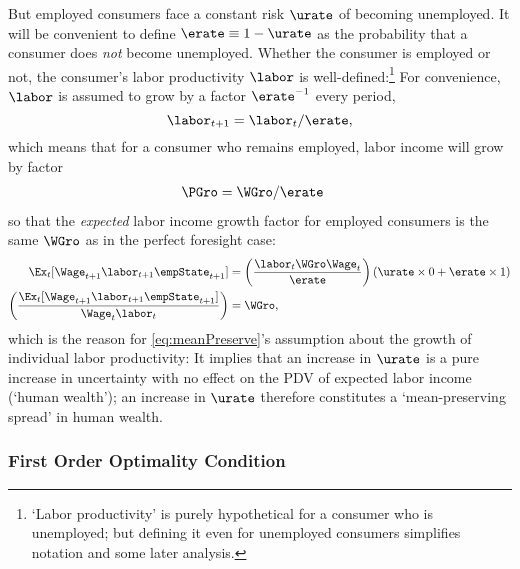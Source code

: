 \documentclass{\handout}
\begin{document}
But employed consumers face a constant risk $\urate$ of becoming unemployed.  
It will be convenient to define $\erate\equiv 1-\urate$ as the probability that a consumer does {\it not} become unemployed.  Whether the consumer is employed or not, the consumer's labor productivity $\labor$ is well-defined:\footnote{`Labor productivity' is purely hypothetical for a consumer who is unemployed; but defining it even for unemployed consumers simplifies notation and some later analysis.}  For convenience, $\labor$ is assumed to grow by a factor $\erate^{-1}$ every period,
\begin{equation}
\labor_{t+1} =    \labor_{t}/\erate \label{eq:meanPreserve},
\end{equation}
which means that for a consumer who remains employed, labor income will grow by factor
\begin{equation}\begin{gathered}\begin{aligned}
  \PGro & =  \WGro/\erate
\end{aligned}\end{gathered}\end{equation}
so that the {\it expected} labor income growth factor for
employed consumers is the same $\WGro$ as in the perfect foresight case:
\begin{equation*}\begin{gathered}\begin{aligned}
  \Ex_{t}[\Wage_{t+1}\labor_{t+1}\empState_{t+1}] & =   \left(\frac{\labor_{t} \WGro \Wage_{t}}{\erate}\right)\left(\urate \times 0 + \erate \times 1 \right)
\\ \left(\frac{\Ex_{t}[\Wage_{t+1}\labor_{t+1}\empState_{t+1}]}{\Wage_{t} \labor_{t}}\right) &  =  \WGro
,
\end{aligned}\end{gathered}\end{equation*}
which is  the reason for \eqref{eq:meanPreserve}'s assumption about the growth of
individual labor productivity: It implies
that an increase in $\urate$ is a pure increase in uncertainty with no
effect on the PDV of expected labor income (`human wealth'); an increase in $\urate$ therefore constitutes a `mean-preserving spread' in human wealth.

\subsubsection{First Order Optimality Condition}
\end{document}

